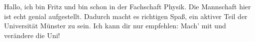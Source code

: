 \begin{multicols}{2}
%
%
%
%

\vspace{6ex}

{
Hallo, ich bin Fritz und bin schon  in der Fachschaft Physik.
Die Mannschaft hier ist echt genial aufgestellt. Dadurch macht es richtigen Spaß, ein aktiver Teil der Universität Münster zu sein.
Ich kann dir nur empfehlen: Mach' mit und verändere die Uni!
}


\end{multicols}

\vspace{20ex}
